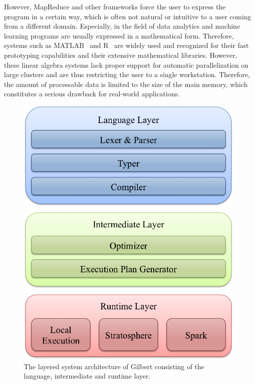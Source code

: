 However, MapReduce and other frameworks force the user to express the program in a certain way, which is often not natural or intuitive to a user coming from a different domain.
Especially, in the field of data analytics and machine learning programs are usually expressed in a mathematical form.
Therefore, systems such as MATLAB~\cite{matlab} and R~\cite{r:1993a} are widely used and recognized for their fast prototyping capabilities and their extensive mathematical libraries.
However, these linear algebra systems lack proper support for automatic parallelization on large clusters and are thus restricting the user to a single workstation.
Therefore, the amount of processable data is limited to the size of the main memory, which constitutes a serious drawback for real-world applications.

\begin{figure}[t!]
\centering
\includegraphics[height=0.175\paperheight]{images/systemArchitecture.png}
\caption{The layered system architecture of Gilbert consisting of the language, intermediate and runtime layer.}
\label{fig:systemArchitecture}
\end{figure}

